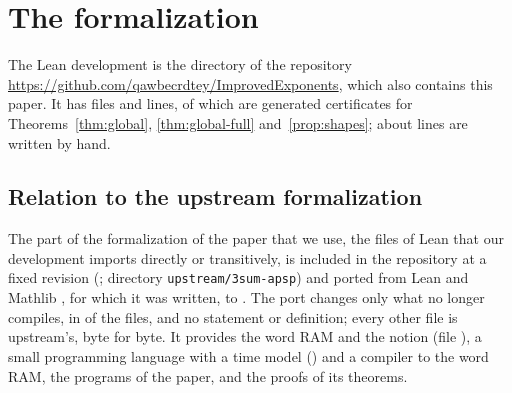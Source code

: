 \section{The formalization}
\label{sec:formalization}

The Lean development is the directory  of the
repository \url{https://github.com/qawbecrdtey/ImprovedExponents}, which also
contains this paper.  It has \LeanFiles{} files and
\LeanLines{} lines, of which \LeanCellLines{} are generated certificates for
Theorems~\ref{thm:global}, \ref{thm:global-full} and~\ref{prop:shapes}; about
\LeanHandLines{} lines are written by hand.

\subsection{Relation to the upstream formalization}

The part of the formalization \cite{upstream} of the paper that we use, the
\UpstreamFiles{} files of Lean that our development imports directly or
transitively, is included in the repository at a fixed revision
(\texttt{\UpstreamRev}; directory \texttt{upstream/3sum-apsp}) and ported
from Lean and Mathlib \texttt{\UpstreamVersion}, for which it was written, to
\texttt{\LeanVersion}.  The port changes only what no longer compiles, in
\UpstreamChanged{} of the files, and no statement or definition; every other
file is upstream's, byte for byte.  It provides the word RAM
and the notion  (file ), a
small programming language with a time model () and a compiler
to the word RAM, the programs of the paper, and the proofs of its theorems.

